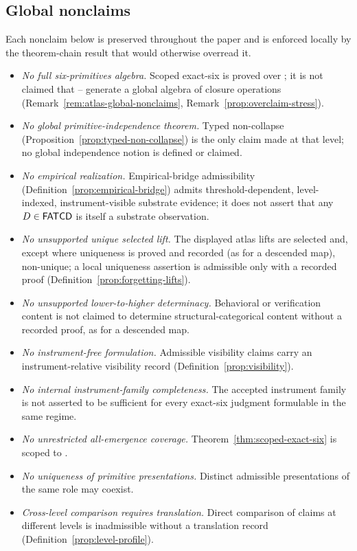 \subsection{Global nonclaims}\label{subsec:global-nonclaims}

Each nonclaim below is preserved throughout the paper and is enforced
locally by the theorem-chain result that would otherwise overread it.

\begin{itemize}[topsep=2pt,itemsep=1pt]
  \item \emph{No full six-primitives algebra.} Scoped exact-six is
    proved over \FATCD{}; it is not claimed that \Pone{}--\Psix{}
    generate a global algebra of closure operations
    (Remark~\ref{rem:atlas-global-nonclaims},
    Remark~\ref{prop:overclaim-stress}).
  \item \emph{No global primitive-independence theorem.} Typed
    non-collapse (Proposition~\ref{prop:typed-non-collapse}) is the
    only claim made at that level; no global independence notion is defined
    or claimed.
  \item \emph{No empirical realization.} Empirical-bridge admissibility
    (Definition~\ref{prop:empirical-bridge}) admits
    threshold-dependent, level-indexed, instrument-visible substrate
    evidence; it does not assert that any \(D \in \mathsf{FATCD}{}\) is itself
    a substrate observation.
  \item \emph{No unsupported unique selected lift.} The displayed atlas lifts
    are selected and, except where uniqueness is proved and recorded (as for
    a descended map), non-unique; a local uniqueness assertion is admissible
    only with a recorded proof (Definition~\ref{prop:forgetting-lifts}).
  \item \emph{No unsupported lower-to-higher determinacy.} Behavioral or
    verification content is not claimed to determine structural-categorical
    content without a recorded proof, as for a descended map.
  \item \emph{No instrument-free formulation.} Admissible visibility claims carry
    an instrument-relative visibility record
    (Definition~\ref{prop:visibility}).
  \item \emph{No internal instrument-family completeness.} The
    accepted instrument family is not asserted to be sufficient for
    every exact-six judgment formulable in the same regime.
  \item \emph{No unrestricted all-emergence coverage.}
    Theorem~\ref{thm:scoped-exact-six} is scoped to \FATCD{}.
  \item \emph{No uniqueness of primitive presentations.} Distinct
    admissible presentations of the same role may coexist.
  \item \emph{Cross-level comparison requires translation.} Direct
    comparison of claims at different levels is inadmissible without a
    translation record (Definition~\ref{prop:level-profile}).
\end{itemize}

